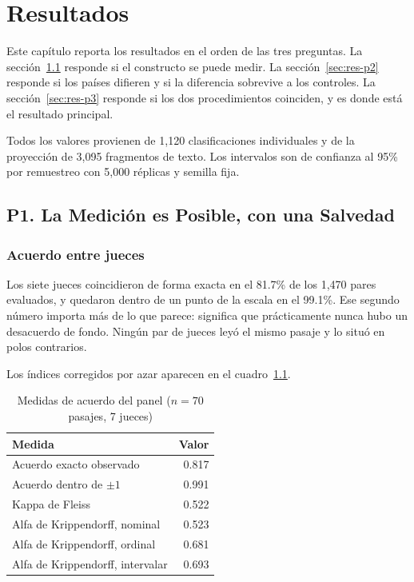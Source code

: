 
\chapter{Resultados}
\label{cap:resultados}

Este capítulo reporta los resultados en el orden de las tres preguntas. La sección~\ref{sec:res-p1} responde si el constructo se puede medir. La sección~\ref{sec:res-p2} responde si los países difieren y si la diferencia sobrevive a los controles. La sección~\ref{sec:res-p3} responde si los dos procedimientos coinciden, y es donde está el resultado principal.

Todos los valores provienen de 1{,}120 clasificaciones individuales y de la proyección de 3{,}095 fragmentos de texto. Los intervalos son de confianza al 95\% por remuestreo con 5{,}000 réplicas y semilla fija.

\section{P1. La Medición es Posible, con una Salvedad}
\label{sec:res-p1}

\subsection{Acuerdo entre jueces}

Los siete jueces coincidieron de forma exacta en el 81.7\% de los 1{,}470 pares evaluados, y quedaron dentro de un punto de la escala en el 99.1\%. Ese segundo número importa más de lo que parece: significa que prácticamente nunca hubo un desacuerdo de fondo. Ningún par de jueces leyó el mismo pasaje y lo situó en polos contrarios.

Los índices corregidos por azar aparecen en el cuadro~\ref{tab:acuerdo}.

\begin{table}[htbp]
\centering
\caption{Medidas de acuerdo del panel ($n = 70$ pasajes, 7 jueces)}
\label{tab:acuerdo}
\begin{tabular}{lr}
\hline
\textbf{Medida} & \textbf{Valor} \\
\hline
Acuerdo exacto observado & 0.817 \\
Acuerdo dentro de $\pm 1$ & 0.991 \\
Kappa de Fleiss & 0.522 \\
Alfa de Krippendorff, nominal & 0.523 \\
Alfa de Krippendorff, ordinal & 0.681 \\
Alfa de Krippendorff, intervalar & 0.693 \\
\hline
\end{tabular}
\end{table}

